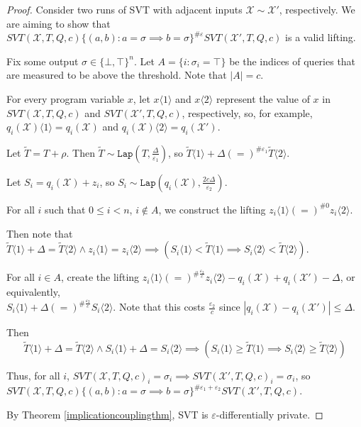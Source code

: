 \documentclass[12pt]{article}
\newcommand{\brangle}[1]{\langle #1 \rangle}
\newcommand{\Lap}{\texttt{Lap}}
\theoremstyle{definition}
\begin{document}
\begin{proof}
    Consider two runs of SVT with adjacent inputs $\mathcal{X}\sim\mathcal{X}'$, respectively. We are aiming to show that $SVT(\mathcal{X}, T, Q, c)\{(a, b): a=\sigma \implies b=\sigma\}^{\#\varepsilon}SVT(\mathcal{X}', T, Q, c)$ is a valid lifting. 

    Fix some output $\sigma \in \{\bot, \top\}^n$. Let $A = \{i:\sigma_i = \top\}$ be the indices of queries that are measured to be above the threshold. Note that $|A| = c$. 
    
    For every program variable $x$, let $x\brangle{1}$ and $x\brangle{2}$ represent the value of $x$ in $SVT(\mathcal{X}, T, Q, c)$ and $SVT(\mathcal{X}', T, Q, c)$, respectively, so, for example, $q_i(\mathcal{X})\brangle{1} = q_i(\mathcal{X})$ and $q_i(\mathcal{X})\brangle{2} = q_i(\mathcal{X}')$. 

    Let $\tilde{T}=T + \rho$. Then $\tilde{T} \sim \Lap(T, \frac{\Delta}{\varepsilon_1})$, so $\tilde{T}\brangle{1} +\Delta (=)^{\#\varepsilon_1}\tilde{T}\brangle{2}$. 

    Let $S_i = q_i(\mathcal{X}) + z_i$, so $S_i \sim\Lap(q_i(\mathcal{X}), \frac{2c\Delta}{\varepsilon_2})$.

    For all $i$ such that $0\leq i < n$, $i\notin A$, we construct the lifting $z_i\langle 1\rangle (=)^{\#0}z_i\langle 2\rangle$. 

    Then note that $\tilde{T}\brangle{1}+\Delta = \tilde{T}\brangle{2}\land z_i\brangle{1} = z_i \brangle{2} \implies (S_i\brangle{1} < \tilde{T}\brangle{1} \implies S_i\brangle{2} < \tilde{T}\brangle{2} )$.

    For all $i\in A$, create the lifting $z_i\brangle{1}(=)^{\#\frac{\varepsilon_2}{c}}z_i\brangle{2} - q_i(\mathcal{X})+q_i(\mathcal{X}')-\Delta$, or equivalently, \\$S_i\brangle{1} +\Delta (=)^{\#\frac{\varepsilon_2}{c}} S_i\brangle{2}$. Note that this costs $\frac{\varepsilon_2}{c}$ since $|q_i(\mathcal{X})-q_i(\mathcal{X}')|\leq \Delta$.

    Then \[\tilde{T}\brangle{1} +\Delta = \tilde{T}\brangle{2} \land S_i\brangle{1} + \Delta = S_i\brangle{2} \implies (S_i\brangle{1} \geq \tilde{T}\brangle{1} \implies S_i\langle 2\rangle \geq \tilde{T}\brangle{2})\]

    Thus, for all $i$, $SVT(\mathcal{X}, T, Q, c)_i = \sigma_i \implies SVT(\mathcal{X}', T, Q, c)_i = \sigma_i$, so $SVT(\mathcal{X}, T, Q, c)\{(a, b): a=\sigma \implies b=\sigma\}^{\#\varepsilon_1+\varepsilon_2}SVT(\mathcal{X}', T, Q, c)$.

    By Theorem \ref{implicationcouplingthm}, SVT is $\varepsilon$-differentially private. 
\end{proof}
\end{document}
